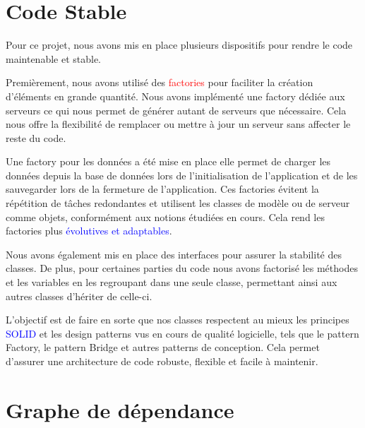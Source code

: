     \bigskip

    \section{Code Stable}

    Pour ce projet, nous avons mis en place plusieurs dispositifs pour rendre le code maintenable et stable.

    \bigskip

    Premièrement, nous avons utilisé des \textcolor{red}{factories} pour faciliter la création d'éléments en grande quantité.
    Nous avons implémenté une factory dédiée aux serveurs ce qui nous permet de générer autant de serveurs que nécessaire.
    Cela nous offre la flexibilité de remplacer ou mettre à jour un serveur sans affecter le reste du code.

    \bigskip

    Une factory pour les données a été mise en place elle permet de charger les données depuis la base de données
    lors de l’initialisation de l’application et de les sauvegarder lors de la fermeture de l’application.
    Ces factories évitent la répétition de tâches redondantes et utilisent les classes de modèle ou de serveur comme objets,
    conformément aux notions étudiées en cours. Cela rend les factories plus \textcolor{blue}{évolutives et adaptables}.

    \bigskip

    Nous avons également mis en place des interfaces pour assurer la stabilité des classes.
    De plus, pour certaines parties du code nous avons factorisé les méthodes et les variables en les regroupant
    dans une seule classe, permettant ainsi aux autres classes d’hériter de celle-ci.

    \bigskip

    L’objectif est de faire en sorte que nos classes respectent au mieux les principes \textcolor{blue}{SOLID} et les design patterns vus
    en cours de qualité logicielle, tels que le pattern Factory, le pattern Bridge et autres patterns de conception.
    Cela permet d'assurer une architecture de code robuste, flexible et facile à maintenir.

    \bigskip

    \section{Graphe de dépendance}

    \bigskip

